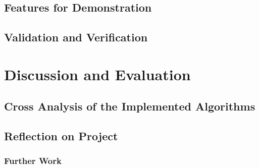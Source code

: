 \section{Features for Demonstration}


\section{Validation and Verification}

\chapter{Discussion and Evaluation}
\section{Cross Analysis of the Implemented Algorithms}


\section{Reflection on Project}
\subsection{Further Work}

